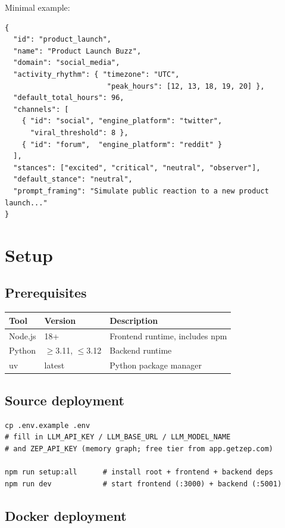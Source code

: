 \documentclass[11pt,a4paper]{article}
\begin{document}
Minimal example:

\begin{lstlisting}
{
  "id": "product_launch",
  "name": "Product Launch Buzz",
  "domain": "social_media",
  "activity_rhythm": { "timezone": "UTC",
                        "peak_hours": [12, 13, 18, 19, 20] },
  "default_total_hours": 96,
  "channels": [
    { "id": "social", "engine_platform": "twitter",
      "viral_threshold": 8 },
    { "id": "forum",  "engine_platform": "reddit" }
  ],
  "stances": ["excited", "critical", "neutral", "observer"],
  "default_stance": "neutral",
  "prompt_framing": "Simulate public reaction to a new product launch..."
}
\end{lstlisting}

\section{Setup}

\subsection{Prerequisites}

\begin{table}[H]
\centering
\begin{tabularx}{\textwidth}{@{}l l X@{}}
\toprule
\textbf{Tool} & \textbf{Version} & \textbf{Description} \\
\midrule
Node.js & 18+ & Frontend runtime, includes npm \\
Python & $\geq$3.11, $\leq$3.12 & Backend runtime \\
uv & latest & Python package manager \\
\bottomrule
\end{tabularx}
\end{table}

\subsection{Source deployment}

\begin{lstlisting}
cp .env.example .env
# fill in LLM_API_KEY / LLM_BASE_URL / LLM_MODEL_NAME
# and ZEP_API_KEY (memory graph; free tier from app.getzep.com)

npm run setup:all      # install root + frontend + backend deps
npm run dev            # start frontend (:3000) + backend (:5001)
\end{lstlisting}

\subsection{Docker deployment}
\end{document}
